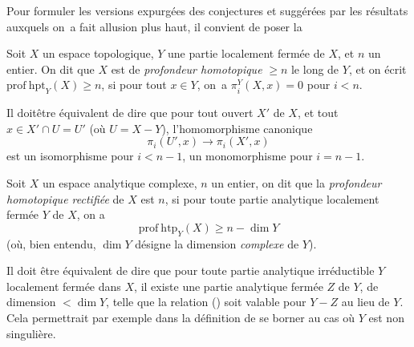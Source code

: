 Pour formuler les versions expurg\'ees des conjectures  et  sugg\'er\'ees par les r\'esultats auxquels on~a fait allusion plus haut, il convient de poser la

\begin{supdefinition} \label{XIII.6.1} Soit $X$ un espace topologique, $Y$ une partie localement ferm\'ee de $X$, et $n$ un entier. On dit que $X$ est de \emph{profondeur homotopique} $\geq n$ le long de $Y$, et on \'ecrit $\mathrm{prof\:hpt}_Y(X)\geq n$, si pour tout $x\in Y$, on~a $\pi_i^Y(X, x)=0$ pour $i<n$.
\end{supdefinition}

Il doit\pageoriginale \^etre \'equivalent de dire que pour tout ouvert $X'$ de $X$, et tout $x\in X'\cap U=U'$ (o\`u $U=X-Y$), l'homomorphisme canonique
$$
\pi_i(U', x)\to\pi_i(X', x)$$
est un isomorphisme pour $i<n-1$, un monomorphisme pour $i=n-1$.

\begin{supdefinition} \label{XIII.6.2}
Soit $X$ un espace analytique complexe, $n$ un entier, on dit que la \emph{profondeur homotopique rectifi\'ee} de $X$ est $n$, si pour toute partie analytique localement ferm\'ee $Y$ de $X$, on a
\begin{equation*} \label{eq:XIII.6.x} \tag{$x$} {\mathrm{prof\:htp}_Y(X)\geq n-\dim Y}
\end{equation*}
(o\`u, bien entendu, $\dim Y$ d\'esigne la dimension \emph{complexe} de $Y$).
\end{supdefinition}

Il doit \^etre \'equivalent de dire que pour toute partie analytique irr\'eductible $Y$ localement ferm\'ee dans $X$, il existe une partie analytique ferm\'ee $Z$ de $Y$, de dimension $<\dim Y$, telle que la relation () soit valable pour $Y-Z$ au lieu de $Y$. Cela permettrait par exemple dans la d\'efinition  de se borner au cas o\`u $Y$ est non singuli\`ere.

